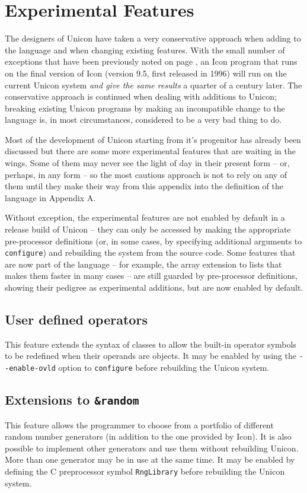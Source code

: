 \chapter{Experimental Features}

The designers of Unicon have taken a very conservative approach when adding to
the language and when changing existing features. With the small number of
exceptions that have been previously noted on page \pageref{Unicon-Icon}, an
Icon program that runs on the final version of Icon (version 9.5, first released
in 1996) will run on the current Unicon system {\em and give the same results\/}
a quarter of a century later. The conservative approach is continued when
dealing with additions to Unicon; breaking existing Unicon programs by making an
incompatible change to the language is, in most circumstances, considered to be
a very bad thing to do.

Most of the development of Unicon starting from it's progenitor has already been
discussed but there are some more experimental features that are waiting in the
wings. Some of them may never see the light of day in their present form -- or,
perhaps, in any form -- so the most cautious approach is not to rely on any of
them until they make their way from this appendix into the definition of the
language in Appendix A.

Without exception, the experimental features are not enabled by default in a
release build of Unicon -- they can only be accessed by making the appropriate
pre-processor definitions (or, in some cases, by specifying additional arguments
to \texttt{configure}) and rebuilding the system from the source code. Some
features that are now part of the language -- for example, the array extension
to lists that makes them faster in many cases -- are still guarded by
pre-processor definitions, showing their pedigree as experimental additions, but
are now enabled by default.


\section{User defined operators}
This feature extends the syntax of classes to allow the built-in operator
symbols to be redefined when their operands are objects. It may be enabled by
using the \texttt{-{}-enable-ovld} option to \texttt{configure} before
rebuilding the Unicon system.

\section{Extensions to \texttt{\&random}}
This feature allows the programmer to choose from a portfolio of different
random number generators (in addition to the one provided by Icon). It is also
possible to implement other generators and use them without rebuilding Unicon.
More than one generator may be in use at the same time.
It may be enabled by defining the C preprocessor symbol \texttt{RngLibrary}
before rebuilding the Unicon system.
